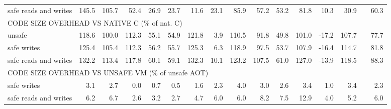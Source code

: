 \begin{landscape}
\begin{table}[t!]
\begin{tabular}{lrrrrrrrrrrrrrrr}
    safe reads and writes               &      145.5 &      105.7 &       52.4 &       26.9 &       23.7 &       11.6 &       23.1 &       85.9 &       57.2 &       53.2 &       81.8 &       10.3 &       30.9 &                   &      60.3 \\
    \multicolumn{10}{l}{CODE SIZE OVERHEAD VS NATIVE C (\% of nat. C)} \\
    unsafe                              &      118.6 &      100.0 &      112.3 &       55.1 &       54.9 &      121.8 &        3.9 &      110.5 &       91.8 &       49.8 &      101.0 &      -17.2 &      107.7 &                   &      77.7 \\
    safe writes                         &      125.4 &      105.4 &      112.3 &       56.2 &       55.7 &      125.3 &        6.3 &      118.9 &       97.5 &       53.7 &      107.9 &      -16.4 &      114.7 &                   &      81.8 \\
    safe reads and writes               &      132.2 &      113.4 &      117.8 &       60.1 &       59.1 &      132.3 &       10.1 &      123.2 &      107.5 &       61.0 &      127.0 &      -13.9 &      118.5 &                   &      88.3 \\
    \multicolumn{10}{l}{CODE SIZE OVERHEAD VS UNSAFE VM (\% of unsafe AOT)} \\
    safe writes                         &        3.1 &        2.7 &        0.0 &        0.7 &        0.5 &        1.6 &        2.3 &        4.0 &        3.0 &        2.6 &        3.4 &        1.0 &        3.4 &                   &       2.3 \\
    safe reads and writes               &        6.2 &        6.7 &        2.6 &        3.2 &        2.7 &        4.7 &        6.0 &        6.0 &        8.2 &        7.5 &       12.9 &        4.0 &        5.2 &                   &       6.0 \\
    \bottomrule
    \end{tabular}
\end{table}
\end{landscape}
\clearpage
\restoregeometry
